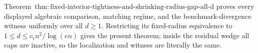 Theorem~\(\mathrm{thm:fixed\text{-}interior\text{-}tightness\text{-}and\text{-}shrinking\text{-}radius\text{-}gap\text{-}all\text{-}d}\) proves every displayed algebraic comparison, matching regime, and the benchmark-divergence witness uniformly over all \(d\ge1\).  Restricting its fixed-radius equivalence to \(1\le d\le c_{\epsilon}n^2/\log(en)\) gives the present theorem; inside the residual wedge all caps are inactive, so the localization and witness are literally the same.